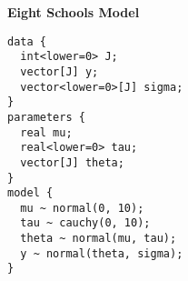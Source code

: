 \documentclass[11pt, oneside, openany]{scrbook}
\begin{document}
\textbf{Eight Schools Model}

\begin{verbatim}
data {
  int<lower=0> J;
  vector[J] y;
  vector<lower=0>[J] sigma;
}
parameters {
  real mu;
  real<lower=0> tau;
  vector[J] theta;
}
model {
  mu ~ normal(0, 10);
  tau ~ cauchy(0, 10);
  theta ~ normal(mu, tau);
  y ~ normal(theta, sigma);
}
\end{verbatim}
\backmatter

\end{document}
